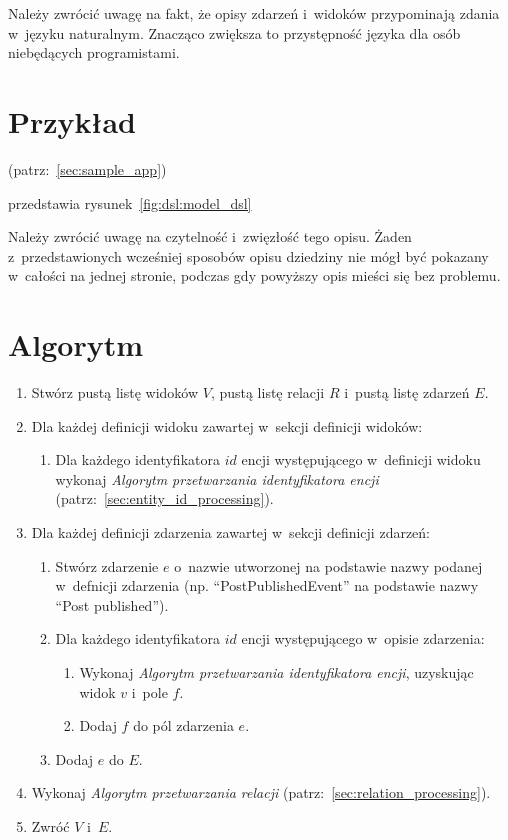 Należy zwrócić uwagę na fakt, że opisy zdarzeń i~widoków przypominają zdania w~języku naturalnym.
Znacząco zwiększa to przystępność języka dla osób niebędących programistami.


\section{Przykład}

(patrz:~\ref{sec:sample_app})

przedstawia rysunek~\ref{fig:dsl:model_dsl}


Należy zwrócić uwagę na czytelność i~zwięzłość tego opisu.
Żaden z~przedstawionych wcześniej sposobów opisu dziedziny nie mógł być pokazany w~całości na jednej stronie, podczas gdy powyższy opis mieści się bez problemu.



\section{Algorytm}

\begin{enumerate}
 \item Stwórz pustą listę widoków $V$, pustą listę relacji $R$ i~pustą listę zdarzeń $E$.
 \item Dla każdej definicji widoku zawartej w~sekcji definicji widoków:
  \begin{enumerate}
   \item Dla każdego identyfikatora $id$ encji występującego w~definicji widoku wykonaj \emph{Algorytm przetwarzania identyfikatora encji} (patrz:~\ref{sec:entity_id_processing}).
  \end{enumerate}
 
 \item Dla każdej definicji zdarzenia zawartej w~sekcji definicji zdarzeń:
  \begin{enumerate}
   \item Stwórz zdarzenie $e$ o~nazwie utworzonej na podstawie nazwy podanej w~defnicji zdarzenia (np. ``PostPublishedEvent'' na podstawie nazwy ``Post published'').
   \item Dla każdego identyfikatora $id$ encji występującego w~opisie zdarzenia:
    \begin{enumerate}
     \item Wykonaj \emph{Algorytm przetwarzania identyfikatora encji}, uzyskując widok $v$ i~pole $f$.
     \item Dodaj $f$ do pól zdarzenia $e$.
    \end{enumerate}
   \item Dodaj $e$ do $E$.
  \end{enumerate}
  
 \item Wykonaj \emph{Algorytm przetwarzania relacji} (patrz:~\ref{sec:relation_processing}).

 \item Zwróć $V$ i~$E$.
\end{enumerate}



